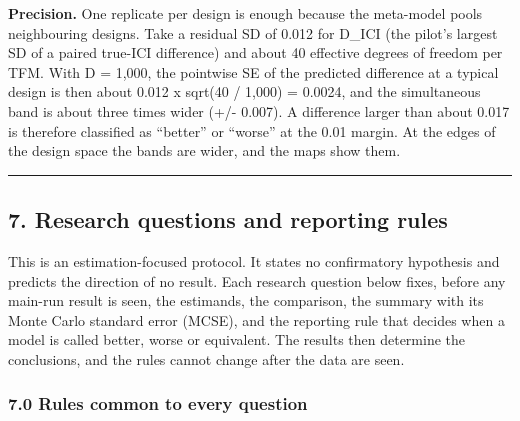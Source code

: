 \documentclass[
  10pt,
]{article}
\begin{document}
\textbf{Precision.} One replicate per design is enough
because the meta-model pools neighbouring designs. Take a
residual SD of 0.012 for D\_ICI (the pilot's largest SD of a
paired true-ICI difference) and about 40 effective degrees
of freedom per TFM. With D = 1,000, the pointwise SE of the
predicted difference at a typical design is then about 0.012
x sqrt(40 / 1,000) = 0.0024, and the simultaneous band is
about three times wider (+/- 0.007). A difference larger
than about 0.017 is therefore classified as ``better'' or
``worse'' at the 0.01 margin. At the edges of the design
space the bands are wider, and the maps show them.

\begin{center}\rule{0.5\linewidth}{0.5pt}\end{center}

\subsection{7. Research questions and reporting
rules}\label{research-questions-and-reporting-rules}

This is an estimation-focused protocol. It states no
confirmatory hypothesis and predicts the direction of no
result. Each research question below fixes, before any
main-run result is seen, the estimands, the comparison, the
summary with its Monte Carlo standard error (MCSE), and the
reporting rule that decides when a model is called better,
worse or equivalent. The results then determine the
conclusions, and the rules cannot change after the data are
seen.

\subsubsection{7.0 Rules common to every
question}\label{rules-common-to-every-question}
\end{document}

